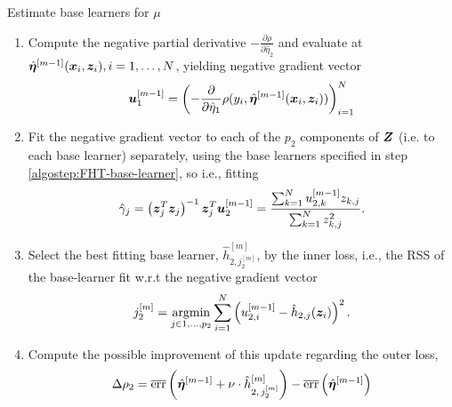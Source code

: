 \begin{algorithm}
\caption{Estimate base learners for $\mu$}
\label{algo:fhtboost-minor2}
\begin{enumerate}
    \item
        Compute the negative partial derivative $-\frac{\partial\rho}{\partial \hat{\eta}_2}$
        and evaluate at $\hat{\boldsymbol{\eta}}^{[m-1]}(\bm{x}_i,\bm{z}_i),i=1,\ldots,N$, yielding negative gradient vector
        \begin{equation*}
            \bm{u}^{[m-1]}_1=\left(-\frac{\partial}{\partial \hat{\eta}_1}\rho(y_i, \hat{\boldsymbol{\eta}}^{[m-1]}(\bm{x}_i,\bm{z}_i))\right)_{i=1}^N
        \end{equation*}
    \item
        Fit the negative gradient vector to each of the $p_2$ components of $\bm{Z}$ (i.e. to each base learner) separately, using the base learners specified in step \ref{algostep:FHT-base-learner}, so i.e., fitting
        \begin{equation*}
            \hat{\gamma}_j=\left(\bm{z}_j^T\bm{z}_j\right)^{-1}\bm{z}_j^T \bm{u}^{[m-1]}_2=\frac{\sum_{k=1}^N u^{[m-1]}_{2,k}z_{k,j}}{\sum_{k=1}^N z_{k,j}^2}.
        \end{equation*}
    \item
        Select the best fitting base learner, $\hat{h}^{[m]}_{2,j_2^{[m]}}$, by the inner loss,
        i.e., the RSS of the base-learner fit w.r.t the negative gradient vector
        \begin{equation*}
            j_2^{[m]}=\operatorname*{argmin}_{j\in 1,\ldots,p_2}\sum_{i=1}^N\left(u_{2,i}^{[m-1]}-\hat{h}_{2,j}(\bm{z}_i)\right)^2.
        \end{equation*}
    \item
        Compute the possible improvement of this update regarding the outer loss,
        \begin{equation*}
            \Delta\rho_2=\overline{\text{err}}\left(\hat{\boldsymbol{\eta}}^{[m-1]} + \nu \cdot \hat{h}^{[m]}_{2,\,j_2^{[m]}} \right)-\overline{\text{err}}\left(\hat{\boldsymbol{\eta}}^{[m-1]}  \right)
        \end{equation*}
\end{enumerate}
\end{algorithm}

